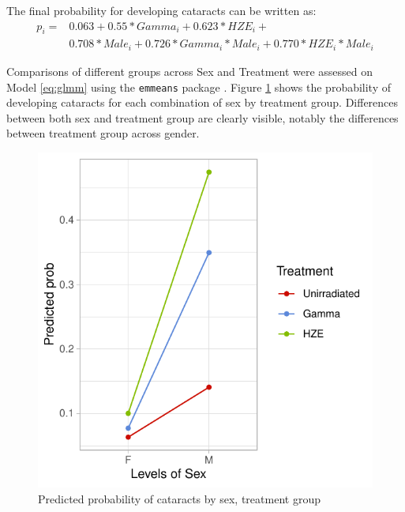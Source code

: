\documentclass[12pt]{article}
\begin{document}
The final probability for developing cataracts can be written as:\\
\begin{equation}
\begin{aligned}
p_i = &0.063 + 0.55*Gamma_i + 0.623*HZE_i + \\
&0.708*Male_i + 0.726*Gamma_i*Male_i + 0.770*HZE_i*Male_i
\end{aligned}
\label{eq:probs}
\end{equation}

Comparisons of different groups across Sex and Treatment were assessed on Model \eqref{eq:glmm} using the \texttt{emmeans} package \citep{R-emmeans}. Figure \ref{fig:contr} shows the probability of developing cataracts for each combination of sex by treatment group. Differences between both sex and treatment group are clearly visible, notably the differences between treatment group across gender.

\begin{figure}[H]

{\centering \includegraphics{bookdown_report_files/figure-latex/contr-1} 

}

\caption{Predicted probability of cataracts by sex, treatment group}\label{fig:contr}
\end{figure}
\end{document}
